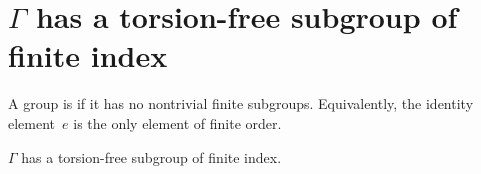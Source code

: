 \section{\texorpdfstring
	{$\Gamma$ has a torsion-free subgroup of finite index}%
	{Γ has a torsion-free subgroup of finite index}}
	 \label{TorsionFreeSect}

\begin{defn}
 A group is  if it has no
nontrivial finite subgroups. Equivalently, the identity
element~$e$ is the only element of finite
order.
 \end{defn}

\begin{thm} \label{torsionfree}
$\Gamma$ has a torsion-free
subgroup of finite index.
 \end{thm}

